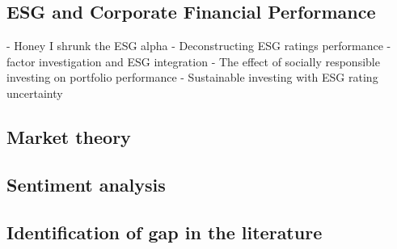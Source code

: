 

\subsection{ESG and Corporate Financial Performance}
- Honey I shrunk the ESG alpha
- Deconstructing ESG ratings performance
- factor investigation and ESG integration
- The effect of socially responsible investing on portfolio performance
- Sustainable investing with ESG rating uncertainty


\subsection{Market theory}


\subsection{Sentiment analysis}

\subsection{Identification of gap in the literature}

